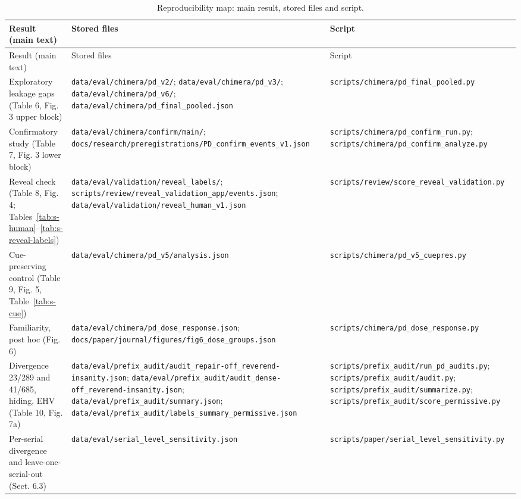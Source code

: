 \documentclass[11pt]{article}
\begin{document}
{\scriptsize\begin{longtable}{p{3.6cm}p{7.0cm}p{4.4cm}}
\caption{Reproducibility map: main result, stored files and script.}\label{tab:s-repro}\\
\toprule Result (main text) & Stored files & Script \\ \midrule \endfirsthead \toprule Result (main text) & Stored files & Script \\ \midrule \endhead
Exploratory leakage gaps (Table 6, Fig. 3 upper block) & \nolinkurl{data/eval/chimera/pd_v2/}; \nolinkurl{data/eval/chimera/pd_v3/}; \nolinkurl{data/eval/chimera/pd_v6/}; \nolinkurl{data/eval/chimera/pd_final_pooled.json} & \nolinkurl{scripts/chimera/pd_final_pooled.py} \\
Confirmatory study (Table 7, Fig. 3 lower block) & \nolinkurl{data/eval/chimera/confirm/main/}; \nolinkurl{docs/research/preregistrations/PD_confirm_events_v1.json} & \nolinkurl{scripts/chimera/pd_confirm_run.py}; \nolinkurl{scripts/chimera/pd_confirm_analyze.py} \\
Reveal check (Table 8, Fig. 4; Tables~\ref{tab:s-human}--\ref{tab:s-reveal-labels}) & \nolinkurl{data/eval/validation/reveal_labels/}; \nolinkurl{scripts/review/reveal_validation_app/events.json}; \nolinkurl{data/eval/validation/reveal_human_v1.json} & \nolinkurl{scripts/review/score_reveal_validation.py} \\
Cue-preserving control (Table 9, Fig. 5, Table~\ref{tab:s-cue}) & \nolinkurl{data/eval/chimera/pd_v5/analysis.json} & \nolinkurl{scripts/chimera/pd_v5_cuepres.py} \\
Familiarity, post hoc (Fig. 6) & \nolinkurl{data/eval/chimera/pd_dose_response.json}; \nolinkurl{docs/paper/journal/figures/fig6_dose_groups.json} & \nolinkurl{scripts/chimera/pd_dose_response.py} \\
Divergence 23/289 and 41/685, hiding, EHV (Table 10, Fig. 7a) & \nolinkurl{data/eval/prefix_audit/audit_repair-off_reverend-insanity.json}; \nolinkurl{data/eval/prefix_audit/audit_dense-off_reverend-insanity.json}; \nolinkurl{data/eval/prefix_audit/summary.json}; \nolinkurl{data/eval/prefix_audit/labels_summary_permissive.json} & \nolinkurl{scripts/prefix_audit/run_pd_audits.py}; \nolinkurl{scripts/prefix_audit/audit.py}; \nolinkurl{scripts/prefix_audit/summarize.py}; \nolinkurl{scripts/prefix_audit/score_permissive.py} \\
Per-serial divergence and leave-one-serial-out (Sect. 6.3) & \nolinkurl{data/eval/serial_level_sensitivity.json} & \nolinkurl{scripts/paper/serial_level_sensitivity.py} \\

\end{longtable}}
\end{document}
